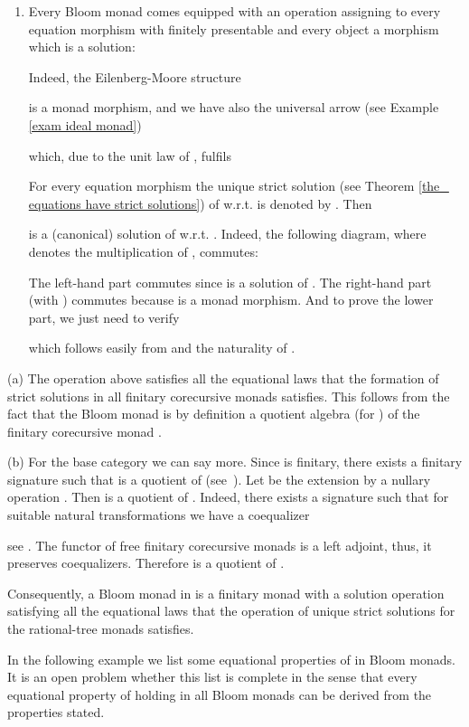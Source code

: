 \documentclass{LMCS}
\theoremstyle{plain}
\theoremstyle{definition}
\numberwithin{equation}{section}
\begin{document}
\begin{defi}
\begin{exa}
\begin{exa}
\begin{rem}
\begin{enumerate}
\item Every Bloom monad  comes equipped with an operation  assigning to every equation morphism  with  finitely presentable and every object  a morphism  which is a solution:

Indeed, the Eilenberg-Moore structure

is a monad morphism, and we have also the universal arrow (see Example \ref{exam ideal monad})

which, due to the unit law of , fulfils

For every equation morphism  the unique strict solution (see Theorem \ref{the_ equations have strict solutions}) of  w.r.t.  is denoted by . Then

is a (canonical) solution of  w.r.t. . Indeed, the following diagram, where  denotes the multiplication of , commutes: 

The left-hand part commutes since  is a solution of . The right-hand part (with ) commutes because  is a monad morphism. And to prove the lower part, we just need to verify

which follows easily from  and
the naturality of .
\end{enumerate}
\end{rem}

\begin{rem}\label{re equational prop}
(a) The operation  above satisfies all the equational laws that the formation of strict solutions in all finitary corecursive monads satisfies. This follows from the fact that the Bloom monad  is by definition a quotient algebra (for ) of the finitary corecursive monad .

(b) For the base category  we can say more. Since  is
finitary, there exists a finitary signature  such that  is
a quotient of  (see~\cite{at}). Let  be the extension by a nullary operation . Then  is a quotient of . Indeed, there exists a signature  such that for suitable natural transformations  we have a coequalizer

see \cite{amm12}. The functor  of free  finitary corecursive monads is a left adjoint, thus, it preserves coequalizers. Therefore  is a quotient of .

Consequently, a Bloom monad in  is a finitary monad with a solution operation  satisfying all the equational laws that the operation of unique strict solutions for the rational-tree monads  satisfies.
\end{rem}

In the following example we list some equational properties of 
in Bloom monads. It is an open problem whether this list is complete
in the sense that every equational property of  holding in all
Bloom monads can be derived from the properties stated.


\end{exa}
\end{exa}
\end{defi}
\end{document}
